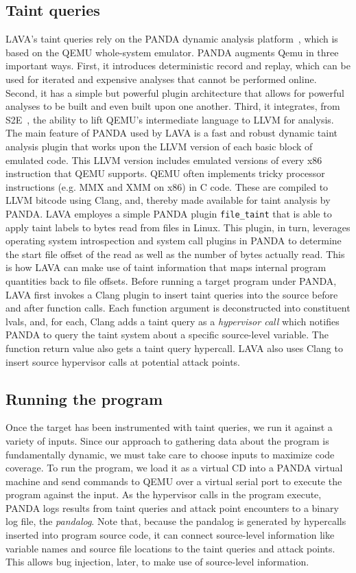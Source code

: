 \subsection{Taint queries}
LAVA's taint queries rely on the PANDA dynamic analysis platform~\cite{PANDA}, which is based on the QEMU whole-system emulator.
PANDA augments Qemu in three important ways.
First, it introduces deterministic record and replay, which can be used for iterated and expensive analyses that cannot be performed online.
Second, it has a simple but powerful plugin architecture that allows for powerful analyses to be built and even built upon one another.
Third, it integrates, from S2E~\cite{S2E}, the ability to lift QEMU's intermediate language to LLVM for analysis.
The main feature of PANDA used by LAVA is a fast and robust dynamic taint analysis plugin that works upon the LLVM version of each 
basic block of emulated code.
This LLVM version includes emulated versions of every x86 instruction that QEMU supports.
QEMU often implements tricky processor instructions (e.g. MMX and XMM on x86) in C code.
These are compiled to LLVM bitcode using Clang, and, thereby made available for taint analysis by PANDA.
LAVA employes a simple PANDA plugin \verb+file_taint+ that is able to apply taint labels to bytes read from files in Linux.
This plugin, in turn, leverages operating system introspection and system call plugins in PANDA to determine the start file offset of the read as well as the number of bytes actually read.
This is how LAVA can make use of taint information that maps internal program quantities back to file offsets.  
Before running a target program under PANDA, LAVA first invokes a Clang plugin to insert taint queries into the source before and after function calls.
Each function argument is deconstructed into constituent lvals, and, for each, Clang adds a taint query as a \emph{hypervisor call} which notifies PANDA to query the taint system about a specific source-level variable.
The function return value also gets a taint query hypercall.
LAVA also uses Clang to insert source hypervisor calls at potential attack points.

\subsection{Running the program}
Once the target has been instrumented with taint queries, we run it against a variety of inputs.
Since our approach to gathering data about the program is fundamentally dynamic, we must take care to choose inputs to maximize code coverage.
To run the program, we load it as a virtual CD into a PANDA virtual machine and send commands to QEMU over a virtual serial port to execute the program against the input.
As the hypervisor calls in the program execute, PANDA logs results from taint queries and attack point encounters to a binary log file, the \emph{pandalog}.
Note that, because the pandalog is generated by hypercalls inserted into program source code, it can connect source-level information like variable names and source file locations to the taint queries and attack points.
This allows bug injection, later, to make use of source-level information. 


